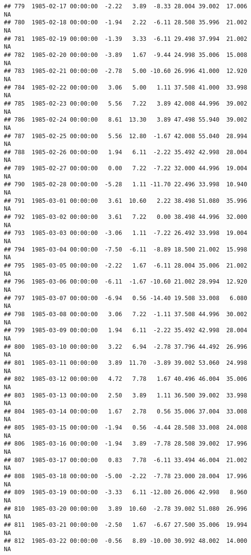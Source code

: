 \documentclass{article}\usepackage{graphicx, color}
\makeatletter
\newenvironment{kframe}{%
 \def\at@end@of@kframe{}%
 \ifinner\ifhmode%
  \def\at@end@of@kframe{\end{minipage}}%
  \begin{minipage}{\columnwidth}%
 \fi\fi%
 \def\FrameCommand##1{\hskip\@totalleftmargin \hskip-\fboxsep
 \colorbox{shadecolor}{##1}\hskip-\fboxsep
     \hskip-\linewidth \hskip-\@totalleftmargin \hskip\columnwidth}%
 \MakeFramed {\advance\hsize-\width
   \@totalleftmargin\z@ \linewidth\hsize
   \@setminipage}}%
 {\par\unskip\endMakeFramed%
 \at@end@of@kframe}
\newenvironment{knitrout}{}{} %
\makeatother
\begin{document}
\begin{knitrout}
\begin{kframe}
\begin{verbatim}
## 779  1985-02-17 00:00:00  -2.22   3.89  -8.33 28.004 39.002  17.006     NA
## 780  1985-02-18 00:00:00  -1.94   2.22  -6.11 28.508 35.996  21.002     NA
## 781  1985-02-19 00:00:00  -1.39   3.33  -6.11 29.498 37.994  21.002     NA
## 782  1985-02-20 00:00:00  -3.89   1.67  -9.44 24.998 35.006  15.008     NA
## 783  1985-02-21 00:00:00  -2.78   5.00 -10.60 26.996 41.000  12.920     NA
## 784  1985-02-22 00:00:00   3.06   5.00   1.11 37.508 41.000  33.998     NA
## 785  1985-02-23 00:00:00   5.56   7.22   3.89 42.008 44.996  39.002     NA
## 786  1985-02-24 00:00:00   8.61  13.30   3.89 47.498 55.940  39.002     NA
## 787  1985-02-25 00:00:00   5.56  12.80  -1.67 42.008 55.040  28.994     NA
## 788  1985-02-26 00:00:00   1.94   6.11  -2.22 35.492 42.998  28.004     NA
## 789  1985-02-27 00:00:00   0.00   7.22  -7.22 32.000 44.996  19.004     NA
## 790  1985-02-28 00:00:00  -5.28   1.11 -11.70 22.496 33.998  10.940     NA
## 791  1985-03-01 00:00:00   3.61  10.60   2.22 38.498 51.080  35.996     NA
## 792  1985-03-02 00:00:00   3.61   7.22   0.00 38.498 44.996  32.000     NA
## 793  1985-03-03 00:00:00  -3.06   1.11  -7.22 26.492 33.998  19.004     NA
## 794  1985-03-04 00:00:00  -7.50  -6.11  -8.89 18.500 21.002  15.998     NA
## 795  1985-03-05 00:00:00  -2.22   1.67  -6.11 28.004 35.006  21.002     NA
## 796  1985-03-06 00:00:00  -6.11  -1.67 -10.60 21.002 28.994  12.920     NA
## 797  1985-03-07 00:00:00  -6.94   0.56 -14.40 19.508 33.008   6.080     NA
## 798  1985-03-08 00:00:00   3.06   7.22  -1.11 37.508 44.996  30.002     NA
## 799  1985-03-09 00:00:00   1.94   6.11  -2.22 35.492 42.998  28.004     NA
## 800  1985-03-10 00:00:00   3.22   6.94  -2.78 37.796 44.492  26.996     NA
## 801  1985-03-11 00:00:00   3.89  11.70  -3.89 39.002 53.060  24.998     NA
## 802  1985-03-12 00:00:00   4.72   7.78   1.67 40.496 46.004  35.006     NA
## 803  1985-03-13 00:00:00   2.50   3.89   1.11 36.500 39.002  33.998     NA
## 804  1985-03-14 00:00:00   1.67   2.78   0.56 35.006 37.004  33.008     NA
## 805  1985-03-15 00:00:00  -1.94   0.56  -4.44 28.508 33.008  24.008     NA
## 806  1985-03-16 00:00:00  -1.94   3.89  -7.78 28.508 39.002  17.996     NA
## 807  1985-03-17 00:00:00   0.83   7.78  -6.11 33.494 46.004  21.002     NA
## 808  1985-03-18 00:00:00  -5.00  -2.22  -7.78 23.000 28.004  17.996     NA
## 809  1985-03-19 00:00:00  -3.33   6.11 -12.80 26.006 42.998   8.960     NA
## 810  1985-03-20 00:00:00   3.89  10.60  -2.78 39.002 51.080  26.996     NA
## 811  1985-03-21 00:00:00  -2.50   1.67  -6.67 27.500 35.006  19.994     NA
## 812  1985-03-22 00:00:00  -0.56   8.89 -10.00 30.992 48.002  14.000     NA

\end{verbatim}
\end{kframe}
\end{knitrout}
\end{document}
